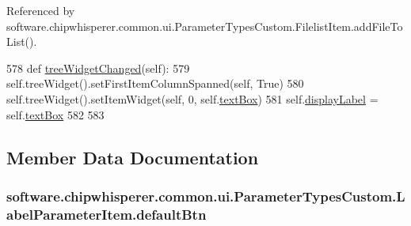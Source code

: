 Referenced by software.\+chipwhisperer.\+common.\+ui.\+Parameter\+Types\+Custom.\+Filelist\+Item.\+add\+File\+To\+List().


\begin{DoxyCode}
578     \textcolor{keyword}{def }\hyperlink{classsoftware_1_1chipwhisperer_1_1common_1_1ui_1_1ParameterTypesCustom_1_1LabelParameterItem_a85fcbfa074152e27ceb2634e203a443d}{treeWidgetChanged}(self):
579         self.treeWidget().setFirstItemColumnSpanned(self, \textcolor{keyword}{True})
580         self.treeWidget().setItemWidget(self, 0, self.\hyperlink{classsoftware_1_1chipwhisperer_1_1common_1_1ui_1_1ParameterTypesCustom_1_1LabelParameterItem_ade9d43b95fa43ec2de96142b718d5505}{textBox})
581         self.\hyperlink{classsoftware_1_1chipwhisperer_1_1common_1_1ui_1_1ParameterTypesCustom_1_1LabelParameterItem_a5dac4e8625c835355700497e2b9d36e2}{displayLabel} = self.\hyperlink{classsoftware_1_1chipwhisperer_1_1common_1_1ui_1_1ParameterTypesCustom_1_1LabelParameterItem_ade9d43b95fa43ec2de96142b718d5505}{textBox}
582 
583 
\end{DoxyCode}


\subsection{Member Data Documentation}
\hypertarget{classsoftware_1_1chipwhisperer_1_1common_1_1ui_1_1ParameterTypesCustom_1_1LabelParameterItem_a17977f3b50ffd3df2da84417e85ddd40}{}
\subsubsection[{default\+Btn}]{\setlength{\rightskip}{0pt plus 5cm}software.\+chipwhisperer.\+common.\+ui.\+Parameter\+Types\+Custom.\+Label\+Parameter\+Item.\+default\+Btn}\label{classsoftware_1_1chipwhisperer_1_1common_1_1ui_1_1ParameterTypesCustom_1_1LabelParameterItem_a17977f3b50ffd3df2da84417e85ddd40}
\hypertarget{classsoftware_1_1chipwhisperer_1_1common_1_1ui_1_1ParameterTypesCustom_1_1LabelParameterItem_a5dac4e8625c835355700497e2b9d36e2}{}
